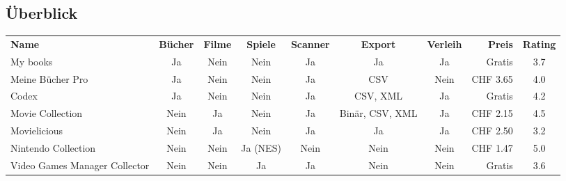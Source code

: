 \newpage

\begin{landscape}
	\section{Überblick} 
	\begin{tabular}{|l|c|c|c|c|c|c|r|c|}
		\rowcolor{black} 
		\color{white}\textbf{Name} & \color{white}\textbf{Bücher} & \color{white}\textbf{Filme} & \color{white}\textbf{Spiele} & \color{white}\textbf{Scanner} & \color{white}\textbf{Export} & \color{white}\textbf{Verleih} & \color{white}\textbf{Preis} & \color{white}\textbf{Rating} \\
		My books & Ja & \color{red}Nein & \color{red}Nein & Ja & Ja & Ja & Gratis & 3.7 \\ \hline
		\rowcolor{DarkSeaGreen} Meine Bücher Pro & Ja & \color{red}Nein & \color{red}Nein & Ja & CSV & \color{black}Nein & CHF 3.65 & 4.0 \\ \hline
		Codex & Ja & \color{red}Nein & \color{red}Nein & Ja & CSV, XML & Ja & Gratis & 4.2 \\ \hline
		\rowcolor{DarkSeaGreen} Movie Collection & \color{red}Nein & Ja & \color{red}Nein & Ja & Binär, CSV, XML & Ja & CHF 2.15 & 4.5 \\ \hline
		Movielicious & \color{red}Nein & Ja & \color{red}Nein & Ja & Ja & Ja & CHF 2.50 & 3.2 \\ \hline
		\rowcolor{DarkSeaGreen} Nintendo Collection & \color{red}Nein & \color{red}Nein & Ja (NES) & \color{red}Nein & \color{red}Nein & \color{red}Nein & CHF 1.47 & 5.0 \\ \hline
		Video Games Manager Collector &  \color{red}Nein & \color{red}Nein & Ja & Ja & Nein & Nein & Gratis & 3.6 \\ \hline
	\end{tabular} 
\end{landscape} 